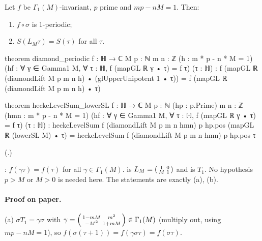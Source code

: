 \begin{theorem}\label{ch16:thm:cosets}
Let $f$ be $\Gamma_1(M)$-invariant, $p$ prime and $mp-nM=1$.  Then:
\begin{enumerate}[label=(\alph*)]
\item $f\circ\sigma$ is $1$-periodic;
\item $S(L_M\tau)=S(\tau)$ for all $\tau$.
\end{enumerate}
\end{theorem}
\begin{leancode}
theorem diamond_periodic {f : ℍ → ℂ} {M p : ℕ} {m n : ℤ} (h : m * p - n * M = 1)
    (hf : ∀ γ ∈ Gamma1 M, ∀ τ : ℍ, f (mapGL ℝ γ • τ) = f τ) (τ : ℍ) :
    f (mapGL ℝ (diamondLift M p m n h) • (glUpperUnipotent 1 • τ)) =
      f (mapGL ℝ (diamondLift M p m n h) • τ)

theorem heckeLevelSum_lowerSL {f : ℍ → ℂ} {M p : ℕ} (hp : p.Prime) {m n : ℤ}
    (hmn : m * p - n * M = 1) (hf : ∀ γ ∈ Gamma1 M, ∀ τ : ℍ, f (mapGL ℝ γ • τ) = f τ) (τ : ℍ) :
    heckeLevelSum f (diamondLift M p m n hmn) p hp.pos (mapGL ℝ (lowerSL M) • τ) =
      heckeLevelSum f (diamondLift M p m n hmn) p hp.pos τ
\end{leancode}
(.)
\begin{dictionary}
: $f(\gamma\tau)=f(\tau)$ for all $\gamma\in\Gamma_1(M)$.   is $L_M=\left(\begin{smallmatrix}1&0\\M&1\end{smallmatrix}\right)$ and
 is $T_1$.  No hypothesis $p>M$ or $M>0$ is needed here.  The statements are exactly (a), (b).
\end{dictionary}
\paragraph{Proof on paper.}  (a) $\sigma T_1=\gamma\sigma$ with $\gamma=\left(\begin{smallmatrix}1-mM&m^2\\-M^2&1+mM\end{smallmatrix}\right)\in\Gamma_1(M)$
(multiply out, using $mp-nM=1$), so $f(\sigma(\tau+1))=f(\gamma\sigma\tau)=f(\sigma\tau)$.

